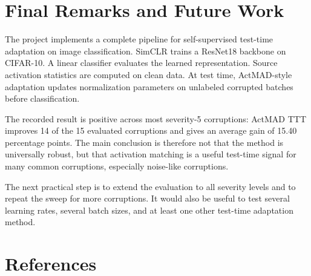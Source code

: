 \documentclass[a4paper,11pt]{article}
\begin{document}
\section{Final Remarks and Future Work}

The project implements a complete pipeline for self-supervised test-time adaptation on image classification. SimCLR trains a ResNet18 backbone on CIFAR-10. A linear classifier evaluates the learned representation. Source activation statistics are computed on clean data. At test time, ActMAD-style adaptation updates normalization parameters on unlabeled corrupted batches before classification.

The recorded result is positive across most severity-5 corruptions: ActMAD TTT improves 14 of the 15 evaluated corruptions and gives an average gain of 15.40 percentage points. The main conclusion is therefore not that the method is universally robust, but that activation matching is a useful test-time signal for many common corruptions, especially noise-like corruptions.

The next practical step is to extend the evaluation to all severity levels and to repeat the sweep for more corruptions. It would also be useful to test several learning rates, several batch sizes, and at least one other test-time adaptation method.

\section{References}
\end{document}
